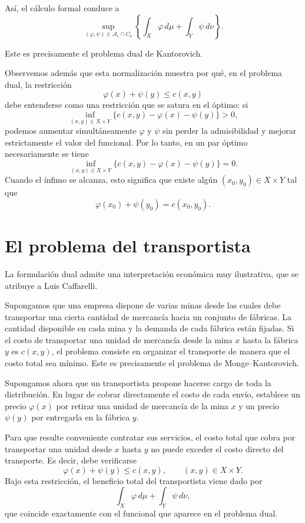 \documentclass[12pt, a4paper]{amsbook}
\theoremstyle{remark}
\theoremstyle{definition}
\numberwithin{section}{chapter}
\numberwithin{subsection}{section}
\numberwithin{equation}{section}
\numberwithin{figure}{chapter}
\begin{document}
Así, el cálculo formal conduce a
\[
\sup_{(\varphi,\psi)\in \mathcal A_c\cap C_b}
\left\{
\int_X\varphi\,d\mu
+
\int_Y\psi\,d\nu
\right\}.
\]

Este es precisamente el problema dual de Kantorovich.

Observemos además que esta normalización muestra por qué, en el problema
dual, la restricción
\[
\varphi(x)+\psi(y)\leq c(x,y)
\]
debe entenderse como una restricción que se satura en el óptimo: si
\[
\inf_{(x,y)\in X\times Y}
\{c(x,y)-\varphi(x)-\psi(y)\}>0,
\]
podemos aumentar simultáneamente $\varphi$ y $\psi$ sin perder la
admisibilidad y mejorar estrictamente el valor del funcional. Por lo tanto,
en un par óptimo necesariamente se tiene
\[
\inf_{(x,y)\in X\times Y}
\{c(x,y)-\varphi(x)-\psi(y)\}=0.
\]
Cuando el ínfimo se alcanza, esto significa que existe algún
$(x_0,y_0)\in X\times Y$ tal que
\[
\varphi(x_0)+\psi(y_0)=c(x_0,y_0).
\]

\section{El problema del transportista}

La formulación dual admite una interpretación económica muy ilustrativa,
que se atribuye a Luis Caffarelli.

Supongamos que una empresa dispone de varias minas desde las cuales debe
transportar una cierta cantidad de mercancía hacia un conjunto de fábricas.
La cantidad disponible en cada mina y la demanda de cada fábrica están
fijadas. Si el costo de transportar una unidad de mercancía desde la mina
$x$ hasta la fábrica $y$ es $c(x,y)$, el problema consiste en organizar el
transporte de manera que el costo total sea mínimo. Este es precisamente el
problema de Monge--Kantorovich.

Supongamos ahora que un transportista propone hacerse cargo de toda la
distribución. En lugar de cobrar directamente el costo de cada envío,
establece un precio $\varphi(x)$ por retirar una unidad de mercancía de la
mina $x$ y un precio $\psi(y)$ por entregarla en la fábrica $y$.

Para que resulte conveniente contratar sus servicios, el costo total que
cobra por transportar una unidad desde $x$ hasta $y$ no puede exceder el
costo directo del transporte. Es decir, debe verificarse
\[
\varphi(x)+\psi(y)\le c(x,y),
\qquad
(x,y)\in X\times Y.
\]
Bajo esta restricción, el beneficio total del transportista viene dado por
\[
\int_X\varphi\,d\mu
+
\int_Y\psi\,d\nu,
\]
que coincide exactamente con el funcional que aparece en el problema dual.
\end{document}
